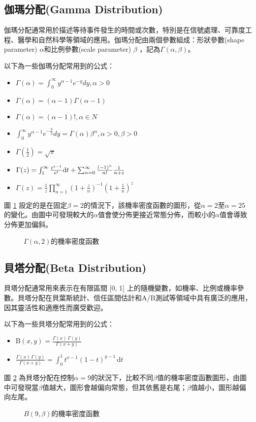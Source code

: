 \subsection{伽瑪分配(Gamma Distribution)}
伽瑪分配通常用於描述等待事件發生的時間或次數，特別是在信號處理、可靠度工程、醫學和自然科學等領域的應用。伽瑪分配由兩個參數組成：形狀參數(shape parameter) $\alpha$和比例參數(scale parameter) $\beta$ ，記為$\Gamma(\alpha , \beta )$。

以下為一些伽瑪分配常用到的公式：
\begin{itemize}
\item $\Gamma(\alpha)=\int_{0}^{\infty} y^{\alpha-1}e^{-y}dy,\alpha>0$
\item $\Gamma(\alpha)=(\alpha-1)\Gamma(\alpha-1)$
\item $\Gamma(\alpha)=(\alpha-1)! ,\alpha \in N$
\item $\int_{0}^{\infty} y^{\alpha-1}e^{-\frac{y}{\beta}}dy=\Gamma(\alpha)\beta^{\alpha},\alpha>0,\beta>0$
\item $\Gamma(\frac{1}{2})=\sqrt{\pi}$
\item $\Gamma(z)=\int_{1}^{\infty}\frac{t^{z-1}}{\mathrm{e}^t}{\rm{d}}t+\sum_{n=0}^{\infty}\frac{(-1)^n}{n!}\frac{1}{n+z}$
\item $\Gamma (z)={\frac  {1}{z}}\prod _{{n=1}}^{{\infty }}\left(1+{\frac  {z}{n}}\right)^{{-1}}\left(1+{\frac  {1}{n}}\right)^{{z}}$
\end{itemize}


圖 \ref{fig:gamma-distribution_pdf} 設定的是在固定$\beta =2$的情況下，該機率密度函數的圖形，從$\alpha =2$至$\alpha =25$的變化。由圖中可發現較大的$\alpha$值會使分佈更接近常態分佈，而較小的$\alpha$值會導致分佈更加偏斜。
\begin{figure}[h]
    \caption{$\Gamma(\alpha ,2)$的機率密度函數}
    \label{fig:gamma-distribution_pdf}
\end{figure}
\subsection{貝塔分配(Beta Distribution)}
貝塔分配通常用來表示在有限區間 [0, 1] 上的隨機變數，如機率、比例或機率參數。貝塔分配在貝葉斯統計、信任區間估計和A/B測試等領域中具有廣泛的應用，因其靈活性和適應性而廣受歡迎。

以下為一些貝塔分配常用到的公式：
\begin{itemize}
\item $\mathrm{B} (x,y)={\frac  {\Gamma (x)\,\Gamma (y)}{\Gamma (x+y)}}$
\item ${\frac  {\Gamma (x)\,\Gamma (y)}{\Gamma (x+y)}}{\displaystyle =\int _{0}^{1}t^{x-1}(1-t)^{y-1}\,\mathrm {d} t\!}$
\end{itemize}
圖 \ref{fig:beta-distribution_pdf} 為貝塔分配在控制$\alpha=9$的狀況下，比較不同$\beta$值的機率密度函數圖形，由圖中可發現當$\beta$值越大，圖形會越偏向常態，但其依舊是右尾；$\beta$值越小，圖形越偏向左尾。
\begin{figure}[h]
    \caption{$B(9,\beta)$的機率密度函數}
    \label{fig:beta-distribution_pdf}
\end{figure}

